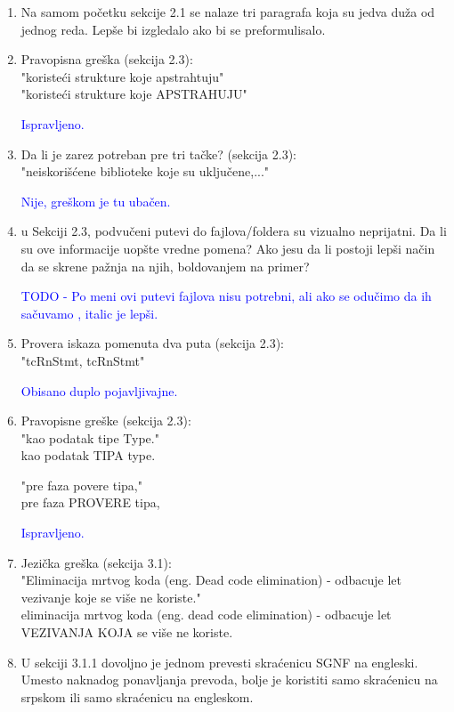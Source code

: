 \documentclass[a4paper]{report}
\newcommand{\odgovor}[1]{\textcolor{blue}{#1}}
\begin{document}
\begin{enumerate}
	
	\item Na samom početku sekcije 2.1 se nalaze tri paragrafa koja su jedva duža od jednog reda. Lepše bi izgledalo ako bi se preformulisalo.
	
	\item Pravopisna greška (sekcija 2.3):\\
	"koristeći strukture koje apstrahtuju"\\
	"koristeći strukture koje APSTRAHUJU"
	
	\odgovor{Ispravljeno.}
	
	\item Da li je zarez potreban pre tri tačke? (sekcija 2.3):\\
	"neiskorišćene biblioteke koje su uključene,..."
	
	\odgovor{Nije, greškom je tu ubačen.}
	
	\item u Sekciji 2.3, podvučeni putevi do fajlova/foldera su vizualno neprijatni. Da li su ove informacije uopšte vredne pomena? Ako jesu da li postoji lepši način da se skrene pažnja na njih, boldovanjem na primer?	
	
	\odgovor{TODO - Po meni ovi putevi fajlova nisu potrebni, ali ako se odučimo da ih sačuvamo , italic je lepši.}
	
	\item Provera iskaza pomenuta dva puta (sekcija 2.3):\\
	"tcRnStmt, tcRnStmt"
	
	\odgovor{Obisano duplo pojavljivajne.}
	
	\item Pravopisne greške (sekcija 2.3):\\
	"kao podatak tipe Type."\\
	kao podatak TIPA type.
	
	"pre faza povere tipa,"\\
	pre faza PROVERE tipa,
	
	\odgovor{Ispravljeno.}

	\item Jezička greška (sekcija 3.1):\\
	"Eliminacija mrtvog koda (eng. Dead code elimination) - odbacuje
	let vezivanje koje se više ne koriste."\\
	eliminacija mrtvog koda (eng. dead code elimination) - odbacuje
	let VEZIVANJA KOJA se više ne koriste.
	
	\item U sekciji 3.1.1 dovoljno je jednom prevesti skraćenicu SGNF na engleski. Umesto naknadog ponavljanja prevoda, bolje je koristiti samo skraćenicu na srpskom ili samo skraćenicu na engleskom.
	

\end{enumerate}
\end{document}

